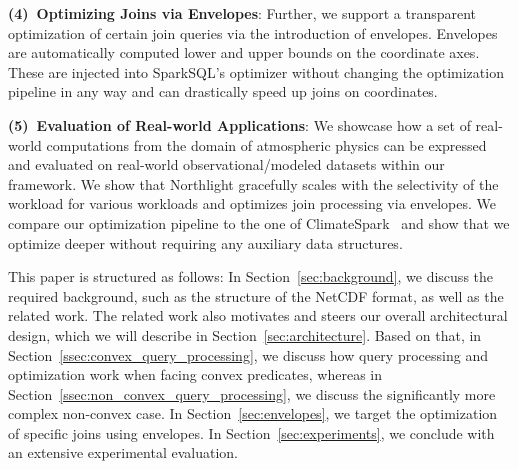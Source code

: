 \documentclass[conference]{IEEEtran}
\newcommand{\system}{Northlight}
\begin{document}
\noindent \textbf{(4)~Optimizing Joins via Envelopes}: Further, we support a transparent optimization of certain join queries via the introduction of envelopes. Envelopes are automatically computed lower and upper bounds on the coordinate axes. These are injected into SparkSQL's optimizer without changing the optimization pipeline in any way and can drastically speed up joins on coordinates. 

\noindent \textbf{(5)~Evaluation of Real-world Applications}: We showcase how a set of real-world computations from the domain of atmospheric physics can be expressed and evaluated on real-world observational/modeled datasets within our framework. We show that \system{} gracefully scales with the selectivity of the workload for various workloads and optimizes join processing via envelopes. We compare our optimization pipeline to the one of ClimateSpark~\cite{lit:climatespark} and show that we optimize deeper without requiring any auxiliary data structures. 










This paper is structured as follows: In Section~\ref{sec:background}, we discuss the required background, such as the structure of the NetCDF format, as well as the related work. The related work also motivates and steers our overall architectural design, which we will describe in Section~\ref{sec:architecture}. Based on that, in Section~\ref{ssec:convex_query_processing}, we discuss how query processing and optimization work when facing convex predicates, whereas in Section~\ref{ssec:non_convex_query_processing}, we discuss the significantly more complex non-convex case. In Section~\ref{sec:envelopes}, we target the optimization of specific joins using envelopes. In Section~\ref{sec:experiments}, we conclude with an extensive experimental evaluation. 
\end{document}
